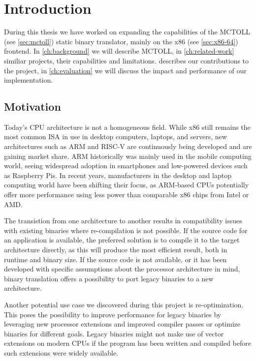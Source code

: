 

\chapter{Introduction}\label{ch:introduction}

During this thesis we have worked on expanding the capabilities of the MCTOLL (see \cref{sec:mctoll}) static binary translator, mainly on the x86 (see \cref{sec:x86-64}) frontend.
In \cref{ch:background} we will describe MCTOLL, in \cref{ch:related-work} similiar projects, their capabilities and limitations.
 describes our contributions to the project, in \cref{ch:evaluation} we will discuss the impact and performance of our implementation.

\section{Motivation}\label{sec:motivation}

Today's CPU architecture is not a homogeneous field.
While x86 still remains the most common \gls{ISA} in use in desktop computers, laptops, and servers, new architectures such as ARM and RISC-V are continuously being developed and are gaining market share.
ARM historically was mainly used in the mobile computing world, seeing widespread adoption in smartphones and low-powered devices such as Raspberry Pis.
In recent years, manufacturers in the desktop and laptop computing world have been shifting their focus, as ARM-based CPUs potentially offer more performance using less power than comparable x86 chips from Intel or AMD\@.

The transistion from one architecture to another results in compatibility issues with existing binaries where re-compilation is not possible.
If the source code for an application is available, the preferred solution is to compile it to the target architecture directly, as this will produce the most efficient result, both in runtime and binary size.
If the source code is not available, or it has been developed with specific assumptions about the processor architecture in mind, binary translation offers a possibility to port legacy binaries to a new architecture.

Another potential use case we discovered during this project is re-optimization.
This poses the possibility to improve performance for legacy binaries by leveraging new processor extensions and improved compiler passes or optimize binaries for different goals.
Legacy binaries might not make use of vector extensions on modern CPUs if the program has been written and compiled before such extensions were widely available.

